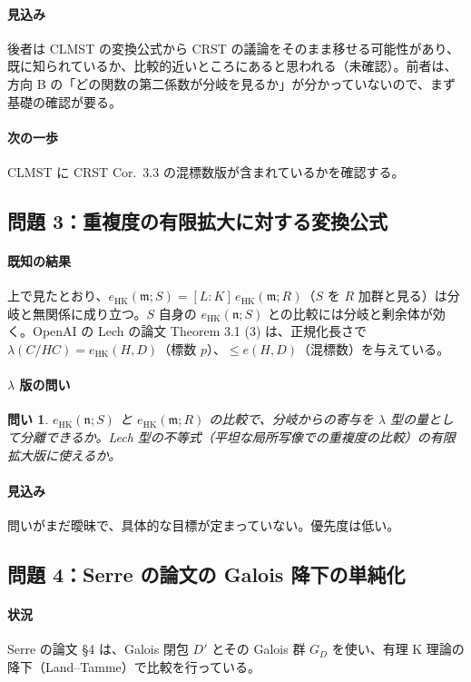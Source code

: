 \documentclass[11pt,a4paper]{ltjsarticle}
\theoremstyle{plain}
\newtheorem{question}{問い}
\theoremstyle{definition}
\theoremstyle{remark}
\theoremstyle{plain}
\newcommand{\m}{\mathfrak{m}}
\newcommand{\n}{\mathfrak{n}}
\newcommand{\eHK}{e_{\mathrm{HK}}}
\begin{document}
\paragraph{見込み}
後者は CLMST の変換公式から CRST の議論をそのまま移せる可能性があり、既に知られているか、比較的近いところにあると思われる（未確認）。前者は、方向 B の「どの関数の第二係数が分岐を見るか」が分かっていないので、まず基礎の確認が要る。

\paragraph{次の一歩}
CLMST に CRST Cor.~3.3 の混標数版が含まれているかを確認する。

\subsection{問題 3：重複度の有限拡大に対する変換公式}

\paragraph{既知の結果}
上で見たとおり、$\eHK(\m;S) = [L:K]\,\eHK(\m;R)$（$S$ を $R$ 加群と見る）は分岐と無関係に成り立つ。$S$ 自身の $\eHK(\n;S)$ との比較には分岐と剰余体が効く。OpenAI の Lech の論文 Theorem 3.1 (3) は、正規化長さで $\lambda(C/HC) = \eHK(H,D)$（標数 $p$）、$\le e(H,D)$（混標数）を与えている。

\paragraph{$\lambda$ 版の問い}
\begin{question}
$\eHK(\n;S)$ と $\eHK(\m;R)$ の比較で、分岐からの寄与を $\lambda$ 型の量として分離できるか。Lech 型の不等式（平坦な局所写像での重複度の比較）の有限拡大版に使えるか。
\end{question}

\paragraph{見込み}
問いがまだ曖昧で、具体的な目標が定まっていない。優先度は低い。

\subsection{問題 4：Serre の論文の Galois 降下の単純化}

\paragraph{状況}
Serre の論文 §4 は、Galois 閉包 $D'$ とその Galois 群 $G_D$ を使い、有理 K 理論の降下（Land--Tamme）で比較を行っている。
\end{document}
